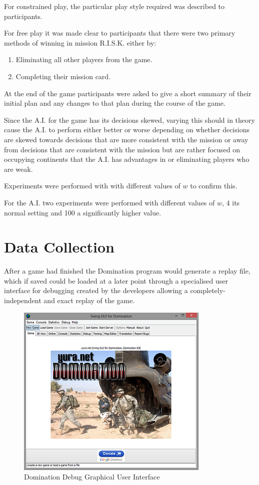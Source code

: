 \documentclass[parskip]{cs4rep}
\begin{document}
For constrained play, the particular play style required was described to participants.

For free play it was made clear to participants that there were two primary methods of winning in mission R.I.S.K. either by:

\begin{enumerate}
\item
Eliminating all other players from the game.
\item
Completing their mission card.
\end{enumerate}

At the end of the game participants were asked to give a short summary of their initial plan and any changes to that plan during the course of the game.

Since the A.I. for the game has its decisions skewed, varying this should in theory cause the A.I. to perform either better or worse depending on whether decisions are skewed towards decisions that are more consistent with the mission or away from decisions that are consistent with the mission but are rather focused on occupying continents that the A.I. has advantages in or eliminating players who are weak.

Experiments were performed with with different values of $w$ to confirm this.

For the A.I. two experiments were performed with different values of $w$, 4 its normal setting and 100 a significantly higher value.

\newpage

\section{Data Collection}

After a game had finished the Domination program would generate a replay file, which if saved could be loaded at a later point through a specialised user interface for debugging created by the developers allowing a completely-independent and exact replay of the game.

\begin{figure}[h]
\centerline{
\includegraphics{images/domination-debug-gui.png}
}
\caption{Domination Debug Graphical User Interface}
\label{fig:dom-debug-gui}
\end{figure} 
\end{document}
